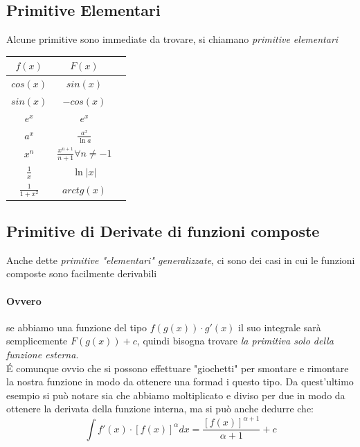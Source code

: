 \documentclass[12pt, a4paper, openany]{book}
\begin{document}
	\subsection{Primitive Elementari}
	Alcune primitive sono immediate da trovare, si chiamano \emph{primitive elementari}\\
	\begin{tabular}{ |c|c|c| }
		\hline
		$f(x)$            & $F(x)$                                  \\
		\hline
		$cos(x)$          & $sin(x)$                                \\
		\hline
		$sin(x)$          & $-cos(x)$                               \\
		\hline
		$e^x$             & $e^x$                                   \\
		\hline
		$a^x$             & $\frac{a^x}{\ln a} $                    \\
		\hline
		$x^n$             & $\frac{x^{n+1}}{n+1} \forall n\neq -1 $ \\
		\hline
		$\frac{1}{x}$     & $\ln |x| $                              \\
		\hline
		$\frac{1}{1+x^2}$ & $arctg(x) $                             \\
		\hline
	\end{tabular}

	\subsection{Primitive di Derivate di funzioni composte}
	Anche dette \emph{primitive "elementari" generalizzate}, ci sono dei casi in cui le funzioni composte sono facilmente derivabili
	\paragraph*{Ovvero} se abbiamo una funzione del tipo $f(g(x)) \cdot g'(x)$ il suo integrale sarà semplicemente $F(g(x)) + c$, quindi bisogna trovare \emph{la primitiva solo della funzione esterna}.
	\\\'E comunque ovvio che si possono effettuare "giochetti" per smontare e rimontare la nostra funzione in modo da ottenere una formad i questo tipo.
	Da quest'ultimo esempio si può notare sia che abbiamo moltiplicato e diviso per due in modo da ottenere la derivata della funzione interna,
	ma si può anche dedurre che:
	$$
	\int f'(x) \cdot [ f(x)]^\alpha dx = \frac{[f(x)]^{\alpha+1}}{\alpha + 1} + c
	$$
\end{document}
